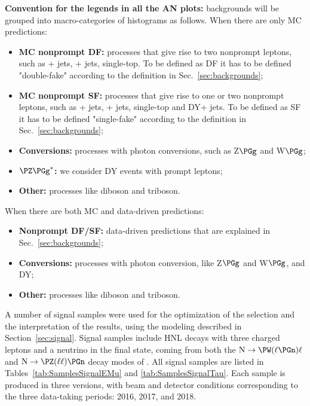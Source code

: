 \textbf{Convention for the legends in all the AN plots:} backgrounds
will be grouped into macro-categories of histograms as follows.
When there are only MC predictions:
\begin{itemize}
\item \textbf{MC nonprompt DF:} processes that give rise to two nonprompt
  leptons, such as \PW + jets, \ttbar + jets, single-top. To be defined as DF it has to be defined "double-fake" according to the definition in Sec.~\ref{sec:backgrounds};
\item \textbf{MC nonprompt SF:} processes that give rise to one or two nonprompt
  leptons, such as \PW + jets, \ttbar + jets, single-top and DY+ jets. To be defined as SF it has to be defined "single-fake" according to the definition in Sec.~\ref{sec:backgrounds};
\item \textbf{Conversions:}  processes with photon conversions, such as Z$\PGg$ and W$\PGg$;
\item \textbf{$\PZ\PGg^{\ast}$:} we consider DY events with prompt leptons;
\item \textbf{Other:} processes like diboson and triboson.
\end{itemize}
When there are both MC and data-driven predictions:
\begin{itemize}
\item \textbf{Nonprompt DF/SF:} data-driven predictions that are explained in Sec.~\ref{sec:backgrounds};
\item \textbf{Conversions:}  processes with photon conversion, like Z$\PGg$ and W$\PGg$, and DY;
\item \textbf{Other:} processes like diboson and triboson.
\end{itemize}


\clearpage
A number of signal samples were used for the optimization of the
selection and the interpretation of the results, using the modeling
described in Section~\ref{sec:signal}.
Signal samples include HNL decays with three charged leptons and a
neutrino in the final state, coming from both the
$\hnl\to\PW(\ell\PGn)\ell$ and $\hnl\to\PZ(\ell\ell)\PGn$ decay modes
of \hnl.
All signal samples are listed in Tables~\ref{tab:SamplesSignalEMu} and
\ref{tab:SamplesSignalTau}. Each sample is produced in three versions,
with beam and detector conditions corresponding to the three
data-taking periods: 2016, 2017, and 2018.

